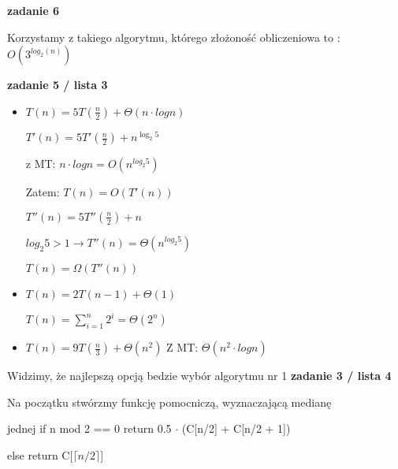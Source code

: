 \documentclass{article}
\begin{document}
\begin{itemize}
        \vspace{1\baselineskip}
        \textbf{zadanie 6} \par
        Korzystamy z takiego algorytmu, którego złożoność obliczeniowa to : $O(3^{log_2(n)})$ \par
    \end{itemize}

    \vspace{1\baselineskip}
    \textbf{zadanie 5 / lista 3} \par
    \begin{itemize}
        \item $T(n) = 5T(\frac{n}{2}) + \Theta(n \cdot logn)$ \par
         $T'(n) = 5T'(\frac{n}{2}) + n^{\log_2{5}}$ \par
         z MT: $n \cdot logn = O(n^{log_2{5}})$ \par
         Zatem: $T(n) = O(T'(n))$ \par
         $T''(n) = 5T''(\frac{n}{2}) + n$ \par
         $log_2{5} > 1 \rightarrow T''(n) = \Theta(n^{log_2{5}})$ \par
         $T(n) = \Omega(T''(n))$ \par

         \item $T(n) = 2T(n-1) + \Theta(1)$ \par
         $T(n) = \sum_{i=1}^n 2^i = \Theta(2^n)$ \par

         \item $T(n) = 9T(\frac{n}{3}) + \Theta(n^2)$
         Z MT: $\Theta(n^2 \cdot logn)$ \par
    \end{itemize}
    Widzimy, że najlepszą opcją bedzie wybór algorytmu nr 1
    \newpage
    \textbf{zadanie 3 / lista 4} \par
    Na początku stwórzmy funkcję pomocniczą, wyznaczającą medianę \par jednej
        if n mod 2 == 0 return 0.5 $\cdot$ (C[n/2] + C[n/2 + 1]) \par
        else return C[$\lceil n/2 \rceil$] \par
\end{document}
